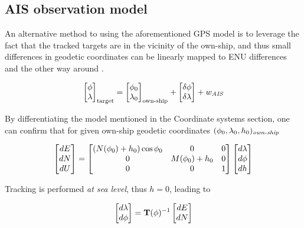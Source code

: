 \subsection{AIS observation model}

An alternative method to using the aforementioned GPS model is to leverage the fact that the tracked targets are in the vicinity of the own-ship, and thus small differences in geodetic coordinates can be linearly mapped to ENU differences and the other way around \cite{Wellenhof1997}.



\begin{equation}
	\begin{bmatrix}
		{\phi}\\ {\lambda}
		\end{bmatrix}_{\text{target}}=
		\begin{bmatrix}
		{\phi}_{0}\\ {\lambda}_{0}
	\end{bmatrix}_{\text{own-ship}} + \begin{bmatrix}
	\delta{\phi} \\ \delta{\lambda}
	\end{bmatrix} + {w}_{\textit{AIS}}
\end{equation}


By differentiating the model mentioned in the Coordinate systems section, one can confirm that for given own-ship geodetic coordinates $({\phi}_0,{\lambda}_0, h_0)_{\textit{own-ship}}$



\begin{equation}
\label{eq:ENUgeodifferences}
\begin{bmatrix}
dE\\dN\\dU
\end{bmatrix}=
\begin{bmatrix}
(N({\phi}_0)+h_0)\cos{\phi}_0 &0 &0\\
0 &M({\phi}_0) + h_0 &0\\
0 &0 &1
\end{bmatrix}
\begin{bmatrix}
d{\lambda}\\d{\phi}\\dh
\end{bmatrix}
\end{equation}


Tracking is performed \emph{at sea level}, thus $h=0$, leading to


\begin{equation}
\begin{bmatrix}
d{\lambda}\\ d{\phi}
\end{bmatrix}=
\mathbf{T}({\phi})^{-1}
\begin{bmatrix}
dE\\ dN
\end{bmatrix}
\end{equation}



